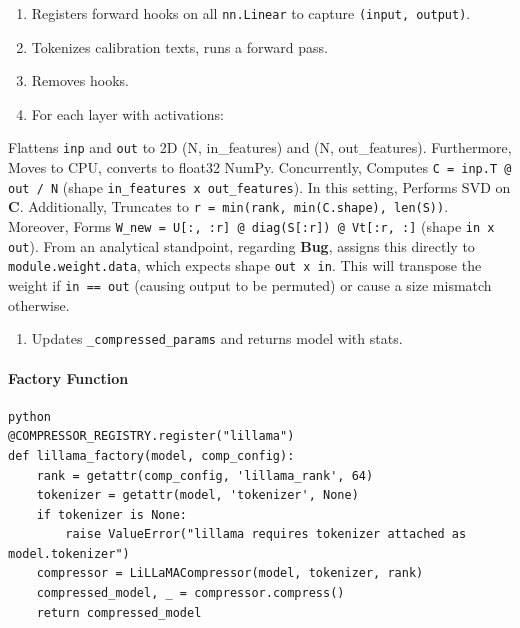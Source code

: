 \begin{enumerate}
\item Registers forward hooks on all \texttt{nn.Linear} to capture \texttt{(input, output)}.
\item Tokenizes calibration texts, runs a forward pass.
\item Removes hooks.
\item For each layer with activations:
\end{enumerate}
Flattens \texttt{inp} and \texttt{out} to 2D (N, in\_features) and (N, out\_features). Furthermore, Moves to CPU, converts to float32 NumPy. Concurrently, Computes \texttt{C = inp.T @ out / N} (shape \texttt{in\_features x out\_features}). In this setting, Performs SVD on \textbf{C}. Additionally, Truncates to \texttt{r = min(rank, min(C.shape), len(S))}. Moreover, Forms \texttt{W\_new = U[:, :r] @ diag(S[:r]) @ Vt[:r, :]} (shape \texttt{in x out}). From an analytical standpoint, regarding \textbf{Bug}, assigns this directly to \texttt{module.weight.data}, which expects shape \texttt{out x in}. This will transpose the weight if \texttt{in == out} (causing output to be permuted) or cause a size mismatch otherwise.

\begin{enumerate}
\item Updates \texttt{\_compressed\_params} and returns model with stats.

\end{enumerate}
\paragraph{Factory Function}

\vspace{0.5em}
\begin{mdframed}[backgroundcolor=codebg, linecolor=codeframe, linewidth=1pt, roundcorner=4pt, innerleftmargin=2pt, innerrightmargin=5pt, innertopmargin=5pt, innerbottommargin=5pt]
\begin{lstlisting}
python
@COMPRESSOR_REGISTRY.register("lillama")
def lillama_factory(model, comp_config):
    rank = getattr(comp_config, 'lillama_rank', 64)
    tokenizer = getattr(model, 'tokenizer', None)
    if tokenizer is None:
        raise ValueError("lillama requires tokenizer attached as model.tokenizer")
    compressor = LiLLaMACompressor(model, tokenizer, rank)
    compressed_model, _ = compressor.compress()
    return compressed_model
\end{lstlisting}
\end{mdframed}
\vspace{0.5em}

